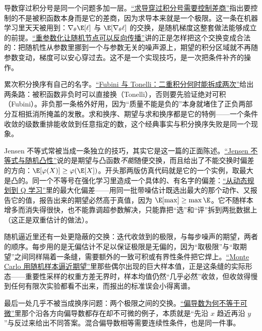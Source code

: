 导数穿过积分号是同一个问题多加一层。\hyperref[sec:12-Real-Analysis-Support/04-Limits-and-Integration/03]{``求导穿过积分号需要控制差商''}指出要控制的不是被积函数本身而是它的差商，因为求导本来就是一个极限。这一条在机器学习里天天被用到：\(\nabla_\theta\E[\ell]\) 与 \(\E[\nabla_\theta \ell]\) 的交换，是随机梯度这整套做法能够成立的前提。\hyperref[sec:14-Deep-Learning/06-Variational-Autoencoders/02]{``重参数化让随机节点可以反向传播''}讲的正是怎样把这个交换变成合法的：把随机性从参数里挪到一个与参数无关的噪声源上，期望的积分区域就不再随参数变动，梯度可以安心穿过去。这不是一个实现技巧，是一次把条件补齐的操作。

累次积分换序有自己的名字。\hyperref[sec:12-Real-Analysis-Support/06-Product-Measures-and-Fubini/02]{``Fubini 与 Tonelli：二重积分何时能拆成两次''}给出两条路：被积函数非负时可以直接换（Tonelli），否则要先验证绝对可积（Fubini）。非负那一条格外好用，因为``质量不能是负的''本身就堵住了正负两部分互相抵消所掩盖的发散。求和换序、期望与求和换序都是它的特例——一个条件收敛的级数重排能收敛到任意指定的数，这个经典事实与积分换序失败是同一个现象。

Jensen 不等式常被当成一条独立的技巧，其实它是这一篇的正面陈述。\hyperref[sec:05-Probability/07-Transforms-and-Bounds/03]{``Jensen 不等式与随机凸性''}说的是期望与凸函数\emph{不能}随便交换，而且给出了不能交换时偏差的方向：\(\E[\varphi(X)]\ge\varphi(\E[X])\)。开头那两版仿真代码就是它的一个实例，取最大是凸的。同一个不等号在强化学习里造成一个具体的、有名字的偏差：\hyperref[sec:16-Control-and-Reinforcement-Learning/02-Reinforcement-Learning/04]{``从动态规划到 Q 学习''}里的最大化偏差——用同一批带噪估计既选出最大的那个动作、又报告它的值，报告出来的期望必然高于真值，因为 \(\E[\max]\ge\max\E\)。它不随样本增多而消失得很快，也不能靠调超参数解决，只能靠把``选''和``评''拆到两批数据上（这正是双重估计的做法）。

随机逼近里还有一处更隐蔽的交换：迭代收敛到的极限，与每步噪声的期望，两者的顺序。每步用的是无偏估计不足以保证极限是无偏的，因为``取极限''与``取期望''之间同样隔着一条缝，需要额外的一致可积或有界性条件把它焊上。\hyperref[sec:13-Machine-Learning/08-Sampling-and-Inference/01]{``Monte Carlo 用随机样本逼近期望''}里那些偶尔出现的巨大样本值，正是这条缝的实际形态——重要性采样的权重方差无界时，样本均值仍然``几乎必然''收敛，但收敛得慢到任何有限次实验都看不出来，而报出的标准误会小得离谱。

最后一处几乎不被当成换序问题：两个极限之间的交换。\hyperref[sec:02-Calculus/06-Multivariable-Calculus/02]{``偏导数为何不等于可微''}里那个沿各方向偏导数都存在却不可微的例子，本质就是``先沿 \(x\) 趋近再沿 \(y\)''与反过来给出不同答案。混合偏导数相等需要连续性条件，也是同一件事。

